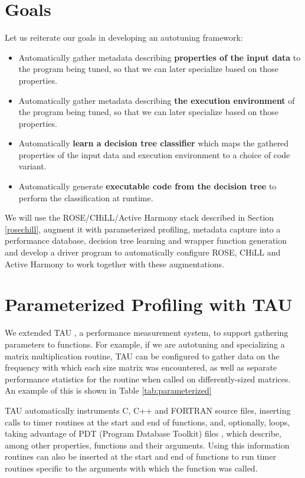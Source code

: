 \documentclass[msthesis,justified,copyright,final,numbers,sort&compress,
gsmodern,amstex,natbib]{uothesis}
\begin{document}
\section{Goals}
\label{goals}

Let us reiterate our goals in developing an autotuning framework:

\begin{itemize}
\item Automatically gather metadata describing \textbf{properties of the input data} to the program being tuned, so that we can later specialize based on those properties.
\item Automatically gather metadata describing \textbf{the execution environment} of the program being tuned, so that we can later specialize based on those properties.
\item Automatically \textbf{learn a decision tree classifier} which maps the gathered properties of the input data and execution environment to a choice of code variant.
\item Automatically generate \textbf{executable code from the decision tree} to perform the classification at runtime.
\end{itemize}

We will use the ROSE/CHiLL/Active Harmony stack described in Section \ref{rosechill}, augment it with parameterized profiling, metadata capture into a performance database, decision tree learning and wrapper function generation and develop a driver program to automatically configure ROSE, CHiLL and Active Harmony to work together with these augmentations.

\section{Parameterized Profiling with TAU}
\label{param}

We extended TAU \cite{tau}, a performance measurement system, to support gathering parameters to functions. For example, if we are autotuning and specializing a matrix multiplication routine, TAU can be configured to gather data on the frequency with which each size matrix was encountered, as well as separate performance statistics for the routine when called on differently-sized matrices. An example of this is shown in Table \ref{tab:parameterized}

TAU automatically instruments C, C++ and FORTRAN source files, inserting calls to timer routines at the start and end of functions, and, optionally, loops, taking advantage of PDT (Program Database Toolkit) files \cite{pdt}, which describe, among other properties, functions and their arguments. Using this information routines can also be inserted at the start and end of functions to run timer routines specific to the arguments with which the function was called. 
\end{document}
